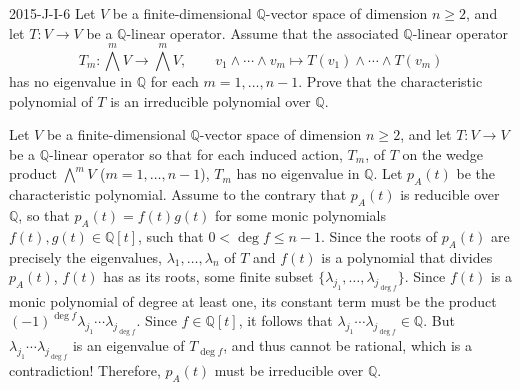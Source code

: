 \documentclass{article}
\begin{document}
	\begin{prb}{2015-J-I-6}
		Let $V$ be a finite-dimensional $\mathbb{Q}$-vector space of dimension $n\geq 2$, and let $T: V \to V$ be a $\mathbb{Q}$-linear operator. Assume that the associated $\mathbb{Q}$-linear operator 
		\begin{equation*}
			T_{m}: \bigwedge^{m}V \to \bigwedge^{m}V, \qquad v_{1} \wedge \dotsm \wedge v_{m} \mapsto T(v_1) \wedge \dotsm \wedge T(v_m)
		\end{equation*}
		has no eigenvalue in $\mathbb{Q}$ for each $m = 1, \ldots, n - 1$. Prove that the characteristic polynomial of $T$ is an irreducible polynomial over $\mathbb{Q}$. 
	\end{prb}
	Let $V$ be a finite-dimensional $\mathbb{Q}$-vector space of dimension $n \geq 2$, and let $T: V \to V$ be a $\mathbb{Q}$-linear operator so that for each induced action, $T_{m}$, of $T$ on the wedge product $\bigwedge^{m}V$ ($m = 1, \ldots, n - 1$), $T_{m}$ has no eigenvalue in $\mathbb{Q}$. Let $p_A(t)$ be the characteristic polynomial. Assume to the contrary that $p_{A}(t)$ is reducible over $\mathbb{Q}$, so that $p_{A}(t) = f(t)g(t)$ for some monic polynomials $f(t), g(t) \in \mathbb{Q}[t]$, such that $0 < \deg{f} \leq n - 1$. Since the roots of $p_A(t)$ are precisely the eigenvalues, $\lambda_{1}, \ldots, \lambda_{n}$ of $T$ and $f(t)$ is a polynomial that divides $p_{A}(t)$, $f(t)$ has as its roots, some finite subset $\{\lambda_{j_1}, \ldots, \lambda_{j_{\deg{f}}}\}$. Since $f(t)$ is a monic polynomial of degree at least one, its constant term must be the product $(-1)^{\deg{f}}\lambda_{j_{1}}\dotsm \lambda_{j_{\deg{f}}}$. Since $f \in \mathbb{Q}[t]$, it follows that $\lambda_{j_{1}}\dotsm \lambda_{j_{\deg{f}}} \in \mathbb{Q}$. But $\lambda_{j_{1}}\dotsm \lambda_{j_{\deg{f}}}$ is an eigenvalue of $T_{\deg{f}}$, and thus cannot be rational, which is a contradiction! Therefore, $p_{A}(t)$ must be irreducible over $\mathbb{Q}$. 
	
\end{document}
